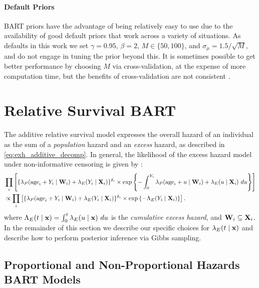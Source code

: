 \documentclass[12pt]{article}
\newcommand{\bfW}{{\bf W}}
\newcommand{\bfX}{{\bf X}}
\newcommand{\bfx}{{\bf x}}
\begin{document}
\paragraph{Default Priors}
BART priors have the advantage of being relatively easy to use due to the availability of good default priors that work across a variety of situations. As defaults in this work we set $\gamma = 0.95$, $\beta = 2$, $M \in \{50, 100\}$, and $\sigma_\mu = 1.5 / \sqrt M$, and do not engage in tuning the prior beyond this. It is sometimes possible to get better performance by choosing $M$ via cross-validation, at the expense of more computation time, but the benefits of cross-validation are not consistent \citep{chipman2010bart, linero2017abayesian}.


\section{Relative Survival BART}\label{sec:relsurv_BART}
 

{The additive relative survival model expresses the overall hazard of an individual as the sum of a \emph{population} hazard and an \emph{excess} hazard, as described in \eqref{eq:exh_additive_decomp}.}
In general, the likelihood of the excess hazard model under non-informative censoring is given by \citep{rubio:2019}:
\begin{align*}
    &\prod_i \left[\{\lambda_P(\text{age}_i + Y_i \mid \bfW_i) + \lambda_E(Y_i \mid \bfX_i)\}^{\delta_i} 
    \times \exp\left\{- \int_0^{Y_i} \lambda_P(\text{age}_i + u \mid \bfW_i) + \lambda_E(u \mid \bfX_i) \ du\right\}\right]
    \\&\propto \prod_i \left[\{\lambda_P(\text{age}_i + Y_i \mid \bfW_i) + \lambda_E(Y_i \mid \bfX_i)\}^{\delta_i} 
    \times \exp\left\{- \Lambda_E(Y_i \mid \bfX_i) \right\}\right].
\end{align*}
where $\Lambda_E(t \mid \bfx) = \int_0^t \lambda_E(u \mid \bfx) \ du$ is the \emph{cumulative excess hazard}, and $\bfW_i \subseteq \bfX_i$.
In the remainder of this section we describe our specific choices for $\lambda_E(t \mid \bfx)$ and describe how to perform posterior inference via Gibbs sampling.

\subsection{Proportional and Non-Proportional Hazards BART Models}
\end{document}

